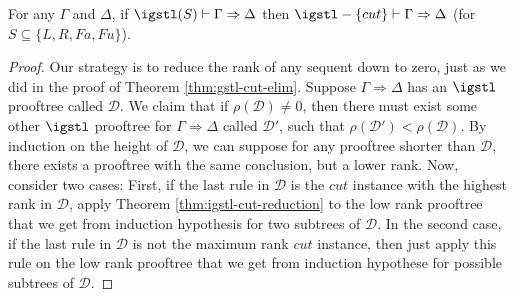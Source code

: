 \begin{thm}\label{thm:igstl-cut-elim}
  For any $\Gamma$ and $\Delta$, if $\igstl(S) \vdash \Gamma \Rightarrow \Delta$ then $\igstl-\{cut\} \vdash \Gamma \Rightarrow \Delta$ (for $S \subseteq \{ L, R, Fa, Fu \}$).
\end{thm}
\begin{proof}
  Our strategy is to reduce the rank of any sequent down to zero, just as we did in the proof of Theorem \ref{thm:gstl-cut-elim}.
  Suppose $\Gamma \Rightarrow \Delta$ has an $\igstl$ prooftree called $\mathcal{D}$. We claim that if $\rho(\mathcal{D}) \neq 0$, then there must exist some other $\igstl$ prooftree for $\Gamma \Rightarrow \Delta$ called $\mathcal{D}'$, such that $\rho(\mathcal{D}') < \rho(\mathcal{D})$. By induction on the height of $\mathcal{D}$, we can suppose for any prooftree shorter than $\mathcal{D}$, there exists a prooftree with the same conclusion, but a lower rank. Now, consider two cases: First, if the last rule in $\mathcal{D}$ is the $cut$ instance with the highest rank in $\mathcal{D}$, apply Theorem \ref{thm:igstl-cut-reduction} to the low rank prooftree that we get from induction hypothesis for two subtrees of $\mathcal{D}$. In the second case, if the last rule in $\mathcal{D}$ is not the maximum rank $cut$ instance, then just apply this rule on the low rank prooftree that we get from induction hypothese for possible subtrees of $\mathcal{D}$.
\end{proof}